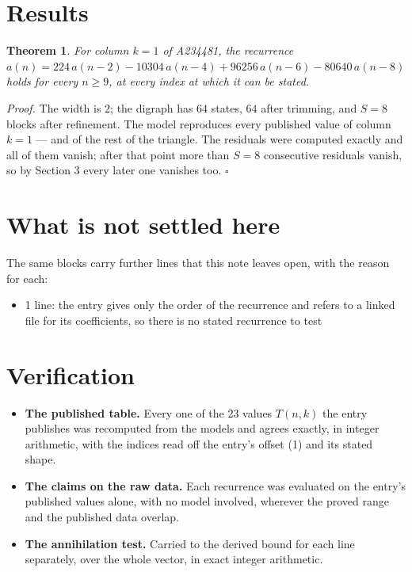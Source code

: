 \documentclass[11pt]{article}
\newtheorem{theorem}{Theorem}
\theoremstyle{definition}
\begin{document}
\section{Results}

\begin{theorem} For column $k = 1$ of A234481, the recurrence $a(n) = 224\,a(n-2) - 10304\,a(n-4) + 96256\,a(n-6) - 80640\,a(n-8)$ holds for every $n \ge 9$, at every index at which it can be stated.\end{theorem}

{\itshape Proof.} The width is $2$; the digraph has $64$ states, $64$ after trimming, and $S = 8$ blocks after refinement. The model reproduces every published value of column $k = 1$ --- and of the rest of the triangle. The residuals were computed exactly and all of them vanish; after that point more than $S = 8$ consecutive residuals vanish, so by Section 3 every later one vanishes too. $\square$

\section{What is not settled here}

The same blocks carry further lines that this note leaves open, with the reason for each:

\begin{itemize}

\item 1 line: the entry gives only the order of the recurrence and refers to a linked file for its coefficients, so there is no stated recurrence to test

\end{itemize}

\section{Verification}

\begin{itemize}

\item {\bfseries The published table.} Every one of the 23 values $T(n,k)$ the entry publishes was recomputed from the models and agrees exactly, in integer arithmetic, with the indices read off the entry's offset (1) and its stated shape.

\item {\bfseries The claims on the raw data.} Each recurrence was evaluated on the entry's published values alone, with no model involved, wherever the proved range and the published data overlap.

\item {\bfseries The annihilation test.} Carried to the derived bound for each line separately, over the whole vector, in exact integer arithmetic.

\end{itemize}
\end{document}
